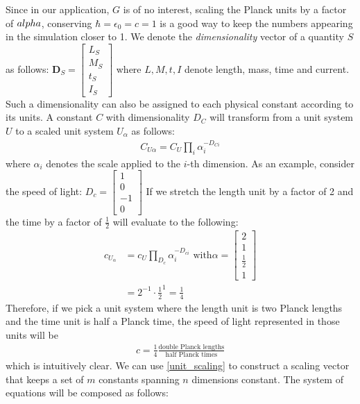 \documentclass[10pt]{report}
\begin{document}
Since in our application, $G$ is of no interest, scaling the Planck units by a factor of $\\alpha$, conserving $\hbar = \epsilon_0 = c = 1$ is a good way to keep the numbers appearing in the simulation closer to 1. We denote the \textit{dimensionality} vector of a quantity $S$ as follows: $ \mathbf{D}_S = \begin{bmatrix}L_S \\ M_S \\ t_S \\ I_S \end{bmatrix} $ where $L, M, t, I$ denote length, mass, time and current. Such a dimensionality can also be assigned to each physical constant according to its units.
A constant $C$ with dimensionality $D_C$ will transform from a unit system $U$ to a scaled unit system $U_\alpha$ as follows:
\begin{align}
C_{U \alpha} = C_U \prod_i{\alpha_i^{-D_{C i}}} \end{align} \label{unit_scaling}
where $\alpha_i$ denotes the scale applied to the $i$-th dimension. 
As an example, consider the speed of light:
$ D_c = \begin{bmatrix}1 \\ 0 \\ -1 \\ 0 \end{bmatrix} $
If we stretch the length unit by a factor of 2 and the time by a factor of $\frac{1}{2}$
will evaluate to the following:
\begin{align*} c_{U_\alpha} &= c_U \prod_{D_c} {\alpha_i^{-D_{c i}}} \text{   with} \alpha = \begin{bmatrix}2 \\ 1 \\ \frac{1}{2} \\ 1 \end{bmatrix} \\ &= 2^{-1} \cdot \frac{1}{2}^1 = \frac{1}{4} \end{align*}
Therefore, if we pick a unit system where the length unit is two Planck lengths and the time unit is half a Planck time, the speed of light represented in those units will be 
\begin{align*} c = \frac{1}{4} \frac{\text{double Planck lengths}}{\text{half Planck times}} \end{align*} which is intuitively clear.
We can use \ref{unit_scaling} to construct a scaling vector that keeps a set of $m$ constants spanning $n$ dimensions constant.
The system of equations will be composed as follows:
\end{document}
